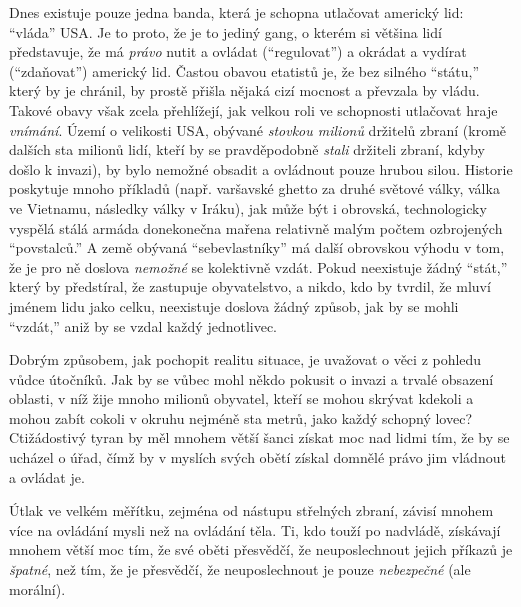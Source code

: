 \documentclass{book}
\begin{document}
Dnes existuje pouze jedna banda, která je schopna utlačovat americký lid: \enquote{vláda} USA. Je to proto, že je to jediný gang, o kterém si většina lidí představuje, že má \emph{právo} nutit a ovládat (\enquote{regulovat}) a okrádat a vydírat (\enquote{zdaňovat}) americký lid. Častou obavou etatistů je, že bez silného \enquote{státu,} který by je chránil, by prostě přišla nějaká cizí mocnost a převzala by vládu. Takové obavy však zcela přehlížejí, jak velkou roli ve schopnosti utlačovat hraje \emph{vnímání}. Území o velikosti USA, obývané \emph{stovkou milionů} držitelů zbraní (kromě dalších sta milionů lidí, kteří by se pravděpodobně \emph{stali} držiteli zbraní, kdyby došlo k invazi), by bylo nemožné obsadit a ovládnout pouze hrubou silou. Historie poskytuje mnoho příkladů (např. varšavské ghetto za druhé světové války, válka ve Vietnamu, následky války v Iráku), jak může být i obrovská, technologicky vyspělá stálá armáda donekonečna mařena relativně malým počtem ozbrojených \enquote{povstalců.} A země obývaná \enquote{sebevlastníky} má další obrovskou výhodu v tom, že je pro ně doslova \emph{nemožné} se kolektivně vzdát. Pokud neexistuje žádný \enquote{stát,} který by předstíral, že zastupuje obyvatelstvo, a nikdo, kdo by tvrdil, že mluví jménem lidu jako celku, neexistuje doslova žádný způsob, jak by se mohli \enquote{vzdát,} aniž by se vzdal každý jednotlivec.

Dobrým způsobem, jak pochopit realitu situace, je uvažovat o věci z pohledu vůdce útočníků. Jak by se vůbec mohl někdo pokusit o invazi a trvalé obsazení oblasti, v níž žije mnoho milionů obyvatel, kteří se mohou skrývat kdekoli a mohou zabít cokoli v okruhu nejméně sta metrů, jako každý schopný lovec? Ctižádostivý tyran by měl mnohem větší šanci získat moc nad lidmi tím, že by se ucházel o úřad, čímž by v myslích svých obětí získal domnělé právo jim vládnout a ovládat je.

Útlak ve velkém měřítku, zejména od nástupu střelných zbraní, závisí mnohem více na ovládání mysli než na ovládání těla. Ti, kdo touží po nadvládě, získávají mnohem větší moc tím, že své oběti přesvědčí, že neuposlechnout jejich příkazů je \emph{špatné}, než tím, že je přesvědčí, že neuposlechnout je pouze \emph{nebezpečné} (ale morální).
\end{document}
